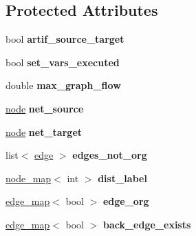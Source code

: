 \subsection*{Protected Attributes}
\begin{DoxyCompactItemize}
\item 
\mbox{\label{classmaxflow__sap_a5d19d178a861e252c84fc392e19bf0ae}} 
bool {\bfseries artif\+\_\+source\+\_\+target}
\item 
\mbox{\label{classmaxflow__sap_aad7f764b9e9732b996f402ffadbf5b70}} 
bool {\bfseries set\+\_\+vars\+\_\+executed}
\item 
\mbox{\label{classmaxflow__sap_a77c650fd11632352a1228f2cbd38caf1}} 
double {\bfseries max\+\_\+graph\+\_\+flow}
\item 
\mbox{\label{classmaxflow__sap_abd4266c76dbd73f7f719d3a4fba2655d}} 
\mbox{\hyperlink{classnode}{node}} {\bfseries net\+\_\+source}
\item 
\mbox{\label{classmaxflow__sap_a8d0e8f448ed29a1329a70c8f4f496c2c}} 
\mbox{\hyperlink{classnode}{node}} {\bfseries net\+\_\+target}
\item 
\mbox{\label{classmaxflow__sap_a70cd2190558b44af3a4300256317dca5}} 
list$<$ \mbox{\hyperlink{classedge}{edge}} $>$ {\bfseries edges\+\_\+not\+\_\+org}
\item 
\mbox{\label{classmaxflow__sap_a14eef09823ae0ac69348c2b3a60e6ca3}} 
\mbox{\hyperlink{classnode__map}{node\+\_\+map}}$<$ int $>$ {\bfseries dist\+\_\+label}
\item 
\mbox{\label{classmaxflow__sap_ac445d8c2f7e2080e890a9cdf7413c372}} 
\mbox{\hyperlink{classedge__map}{edge\+\_\+map}}$<$ bool $>$ {\bfseries edge\+\_\+org}
\item 
\mbox{\label{classmaxflow__sap_a13f2b98efc2a4f62fab4ac391ca83a51}} 
\mbox{\hyperlink{classedge__map}{edge\+\_\+map}}$<$ bool $>$ {\bfseries back\+\_\+edge\+\_\+exists}
\item 
\mbox{\label{classmaxflow__sap_a34793d0909089155a9957deed7c0e1b7}} 

\end{DoxyCompactItemize}
